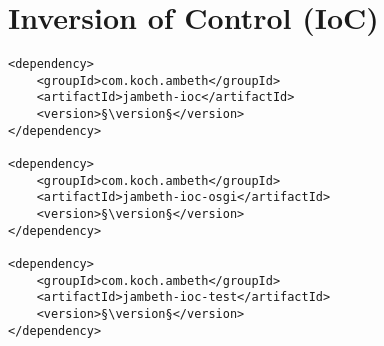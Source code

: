 \section{Inversion of Control (IoC)}
\label{module:IoC}
\ClearAPI
\TODO

\begin{lstlisting}[style=POM,caption={Maven modules to use \emph{Ambeth IoC}}]
<dependency>
	<groupId>com.koch.ambeth</groupId>
	<artifactId>jambeth-ioc</artifactId>
	<version>§\version§</version>
</dependency>

<dependency>
	<groupId>com.koch.ambeth</groupId>
	<artifactId>jambeth-ioc-osgi</artifactId>
	<version>§\version§</version>
</dependency>

<dependency>
	<groupId>com.koch.ambeth</groupId>
	<artifactId>jambeth-ioc-test</artifactId>
	<version>§\version§</version>
</dependency>
\end{lstlisting}
